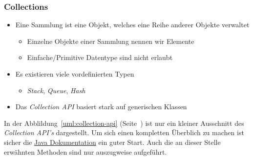 \begin{frame}[fragile]
    \frametitle<presentation>{Collections}
    \begin{itemize}
        \item Eine Sammlung ist eine Objekt, welches eine Reihe anderer
            Objekte verwaltet
        \begin{itemize}
            \item Einzelne Objekte einer Sammlung nennen wir Elemente
            \item Einfache/Primitive Datentype sind nicht erlaubt
        \end{itemize}
        \item Es existieren viele vordefinierten Typen
        \begin{itemize}
            \item \emph{Stack}, \emph{Queue}, \emph{Hash}
        \end{itemize}
        \item Das \emph{Collection API} basiert stark auf generischen Klassen
    \end{itemize}
\end{frame}

In der Abblildung~\ref{uml:collection-api} (Seite~\pageref{uml:collection-api}) ist
nur ein kleiner Ausschnitt des \emph{Collection API's} dargestellt. Um sich einen
kompletten Überblich zu machen ist sicher die
\href{https://docs.oracle.com/en/java/javase/11/docs/api/java.base/java/util/Collection.html}
{Java Dokumentation} ein guter Start. Auch die an dieser Stelle erwähnten Methoden sind
nur auszugweise aufgeführt.

